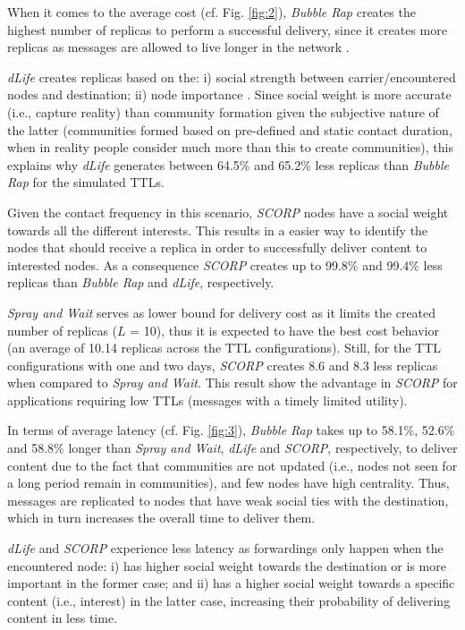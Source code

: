 \documentclass[lnicst]{svmultln}
\begin{document}
When it comes to the average cost (cf. Fig. \ref{fig:2}), \emph{Bubble
Rap} creates the highest number of replicas to perform a successful
delivery, since it creates more replicas as messages are allowed to
live longer in the network \cite{bubble2011}. 

\emph{dLife} creates replicas based on the: i) social strength between
carrier/encountered nodes and destination; ii) node importance \cite{dlife}.
Since social weight is more accurate (i.e., capture reality) than
community formation given the subjective nature of the latter (communities
formed based on pre-defined and static contact duration, when in reality
people consider much more than this to create communities), this explains
why \emph{dLife} generates between 64.5\% and 65.2\% less replicas
than \emph{Bubble Rap} for the simulated TTLs.

Given the contact frequency in this scenario, \emph{SCORP }nodes have
a social weight towards all the different interests. This results
in a easier way to identify the nodes that should receive a replica
in order to successfully deliver content to interested nodes. As a
consequence \emph{SCORP} creates up to 99.8\% and 99.4\% less replicas
than \emph{Bubble Rap} and \emph{dLife}, respectively. 

\emph{Spray and Wait }serves as lower bound for delivery cost as it
limits the created number of replicas ($L$ = 10), thus it is expected
to have the best cost behavior (an average of 10.14 replicas across
the TTL configurations). Still, for the TTL configurations with one
and two days, \emph{SCORP} creates 8.6 and 8.3 less replicas when
compared to \emph{Spray and Wait.} This result show the advantage
in \emph{SCORP} for applications requiring low TTLs (messages with
a timely limited utility).

In terms of average latency (cf. Fig. \ref{fig:3}), \emph{Bubble
Rap} takes up to 58.1\%, 52.6\% and 58.8\% longer than \emph{Spray
and Wait},\emph{ dLife} and \emph{SCORP}, respectively, to deliver
content due to the fact that communities are not updated (i.e., nodes
not seen for a long period remain in communities), and few nodes have
high centrality. Thus, messages are replicated to nodes that have
weak social ties with the destination, which in turn increases the
overall time to deliver them.

\emph{dLife} and \emph{SCORP} experience less latency as forwardings
only happen when the encountered node: i) has higher social weight
towards the destination or is more important in the former case; and
ii) has a higher social weight towards a specific content (i.e., interest)
in the latter case, increasing their probability of delivering content
in less time. 
\end{document}
